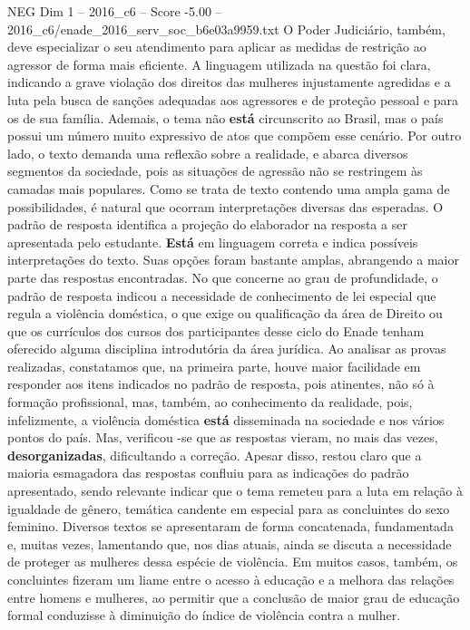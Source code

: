 \begin{textsample}{NEG Dim 1 – 2016\_c6 – Score -5.00 – 2016\_c6/enade\_2016\_serv\_soc\_b6e03a9959.txt}
O Poder Judiciário, também, deve especializar o seu atendimento para aplicar as medidas de restrição ao agressor de forma mais eficiente.
A linguagem utilizada na questão foi clara, indicando a grave violação dos direitos das mulheres injustamente agredidas e a luta pela busca de sanções adequadas aos agressores e de proteção pessoal e para os de sua família.
Ademais, o tema não \textbf{está} circunscrito ao Brasil, mas o país possui um número muito expressivo de atos que compõem esse cenário.
Por outro lado, o texto demanda uma reflexão sobre a realidade, e abarca diversos segmentos da sociedade, pois as situações de agressão não se restringem às camadas mais populares.
Como se trata de texto contendo uma ampla gama de possibilidades, é natural que ocorram interpretações diversas das esperadas.
O padrão de resposta identifica a projeção do elaborador na resposta a ser apresentada pelo estudante. \textbf{Está} em linguagem correta e indica possíveis interpretações do texto.
Suas opções foram bastante amplas, abrangendo a maior parte das respostas encontradas.
No que concerne ao grau de profundidade, o padrão de resposta indicou a necessidade de conhecimento de lei especial que regula a violência doméstica, o que exige ou qualificação da área de Direito ou que os currículos dos cursos dos participantes desse ciclo do Enade tenham oferecido alguma disciplina introdutória da área jurídica.
Ao analisar as provas realizadas, constatamos que, na primeira parte, houve maior facilidade em responder aos itens indicados no padrão de resposta, pois atinentes, não só à formação profissional, mas, também, ao conhecimento da realidade, pois, infelizmente, a violência doméstica \textbf{está} disseminada na sociedade e nos vários pontos do país.
Mas, verificou -se que as respostas vieram, no mais das vezes, \textbf{desorganizadas}, dificultando a correção.
Apesar disso, restou claro que a maioria esmagadora das respostas confluiu para as indicações do padrão apresentado, sendo relevante indicar que o tema remeteu para a luta em relação à igualdade de gênero, temática candente em especial para as concluintes do sexo feminino.
Diversos textos se apresentaram de forma concatenada, fundamentada e, muitas vezes, lamentando que, nos dias atuais, ainda se discuta a necessidade de proteger as mulheres dessa espécie de violência.
Em muitos casos, também, os concluintes fizeram um liame entre o acesso à educação e a melhora das relações entre homens e mulheres, ao permitir que a conclusão de maior grau de educação formal conduzisse à diminuição do índice de violência contra a mulher.

\end{textsample}
